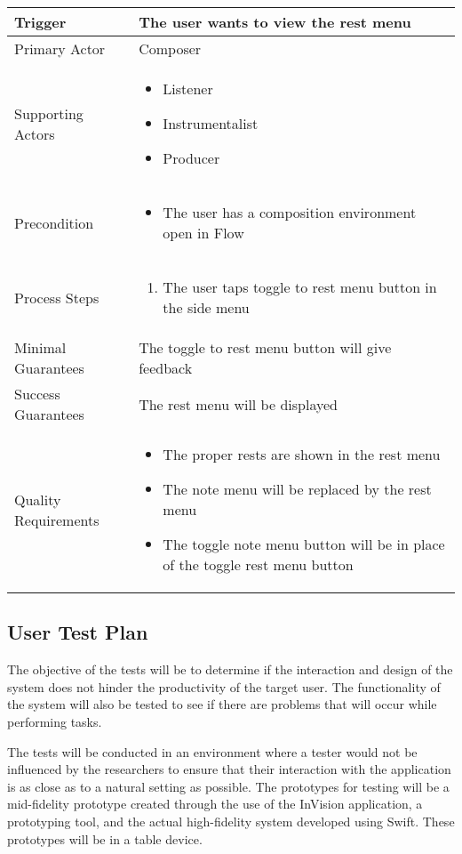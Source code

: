 \begin{tabularx}{\textwidth}{|X|X|}
\hline
Trigger & 
The user wants to view the rest menu \\
\hline
Primary Actor & 
Composer \\
\hline
Supporting Actors & 
\begin{itemize}
\item Listener
\item Instrumentalist
\item Producer
\end{itemize} \\
\hline
Precondition & 
\begin{itemize}
\item The user has a composition environment open in Flow
\end{itemize} \\
\hline
Process Steps & 
\begin{enumerate}
\item The user taps toggle to rest menu button in the side menu
\end{enumerate} \\
\hline
Minimal Guarantees &
The toggle to rest menu button will give feedback\\
\hline
Success Guarantees & 
The rest menu will be displayed \\
\hline
Quality Requirements & 
\begin{itemize}
\item The proper rests are shown in the rest menu
\item The note menu will be replaced by the rest menu
\item The toggle note menu button will be in place of the toggle rest menu button
\end{itemize} \\ 
\hline
\end{tabularx}

\subsection{User Test Plan}

The objective of the tests will be to determine if the interaction and design of the system does not hinder the productivity of the target user. The functionality of the system will also be tested to see if there are problems that will occur while performing tasks.

The tests will be conducted in an environment where a tester would not be influenced by the researchers to ensure that their interaction with the application is as close as to a natural setting as possible. The prototypes for testing will be a mid-fidelity prototype created through the use of the InVision application, a prototyping tool, and the actual high-fidelity system developed using Swift. These prototypes will be in a table device. 

